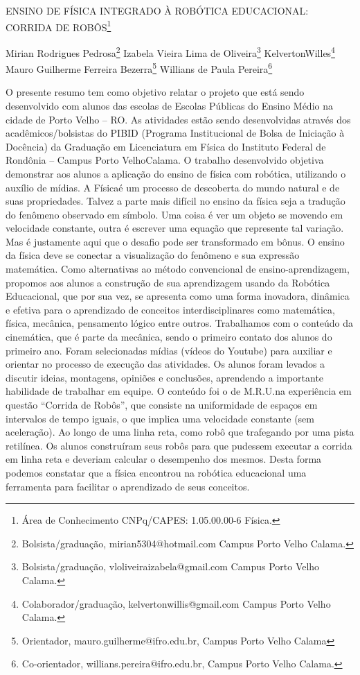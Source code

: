 \documentclass[article,12pt,onesidea,4paper,english,brazil]{abntex2}
\begin{document}
	
	
	\frenchspacing 
	
	\begin{center}
		\LARGE ENSINO DE FÍSICA INTEGRADO À ROBÓTICA EDUCACIONAL: CORRIDA DE ROBÔS\footnote{Área de Conhecimento CNPq/CAPES: 1.05.00.00-6 Física.}
		
		\normalsize
		Mirian Rodrigues Pedrosa\footnote{Bolsista/graduação, mirian5304@hotmail.com Campus Porto Velho Calama.} 
		Izabela Vieira Lima de Oliveira\footnote{Bolsista/graduação, vloliveiraizabela@gmail.com Campus Porto Velho Calama.} 
		KelvertonWilles\footnote{Colaborador/graduação, kelvertonwillis@gmail.com Campus Porto Velho Calama.}\\ 
		Mauro Guilherme Ferreira Bezerra\footnote{Orientador, mauro.guilherme@ifro.edu.br, Campus Porto Velho Calama} 
		Willians de Paula Pereira\footnote{Co-orientador, willians.pereira@ifro.edu.br, Campus Porto Velho Calama.}
	\end{center}
	
	\noindent O presente resumo tem como objetivo relatar o projeto que está sendo desenvolvido com alunos das escolas de Escolas Públicas do Ensino Médio na cidade de Porto Velho – RO.  As atividades estão sendo desenvolvidas através dos acadêmicos/bolsistas do PIBID (Programa Institucional de Bolsa de Iniciação à Docência) da Graduação em Licenciatura em Física do Instituto Federal de Rondônia – Campus Porto VelhoCalama. O trabalho desenvolvido objetiva demonstrar aos alunos a aplicação do ensino de física com robótica, utilizando o auxílio de mídias. A Físicaé um processo de descoberta do mundo natural e de suas propriedades. Talvez a parte mais difícil no ensino da física seja a tradução do fenômeno observado em símbolo. Uma coisa é ver um objeto se movendo em velocidade constante, outra é escrever uma equação que represente tal variação. Mas é justamente aqui que o desafio pode ser transformado em bônus. O ensino da física deve se conectar a visualização do fenômeno e sua expressão matemática. Como alternativas ao método convencional de ensino-aprendizagem, propomos aos alunos a construção de sua aprendizagem usando da Robótica Educacional, que por sua vez, se apresenta como uma forma inovadora, dinâmica e efetiva para o aprendizado de conceitos interdisciplinares como matemática, física, mecânica, pensamento lógico entre outros. Trabalhamos com o conteúdo da cinemática, que é parte da mecânica, sendo o primeiro contato dos alunos do primeiro ano. Foram selecionadas mídias (vídeos do Youtube) para auxiliar e orientar no processo de execução das atividades. Os alunos foram levados a discutir ideias, montagens, opiniões e conclusões, aprendendo a importante habilidade de trabalhar em equipe. O conteúdo foi o de M.R.U.na experiência em questão “Corrida de Robôs”, que consiste na uniformidade de espaços em intervalos de tempo iguais, o que implica uma velocidade constante (sem aceleração). Ao longo de uma linha reta, como robô que trafegando por uma pista retilínea. Os alunos construíram seus robôs para que pudessem executar a corrida em linha reta e deveriam calcular o desempenho dos mesmos. Desta forma podemos constatar que a física encontrou na robótica educacional uma ferramenta para facilitar o aprendizado de seus conceitos.
	
\end{document}
